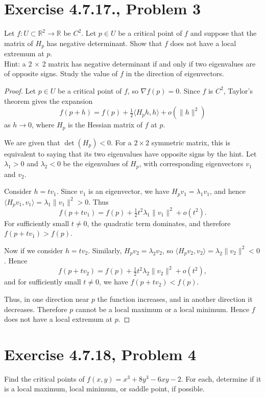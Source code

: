 \documentclass{article}
\begin{document}
\section*{Exercise 4.7.17., Problem 3}
Let $f : U \subset \mathbb{R}^2 \to \mathbb{R}$ be $C^2$. Let $p \in U$ be a critical point of $f$ and suppose that the matrix of $H_p$ has negative determinant. Show that $f$ does not have a local extremum at $p$. \\
Hint: a 2 × 2 matrix has negative determinant if and only if two eigenvalues are of opposite signs. Study the value of $f$ in the direction of eigenvectors. 
\begin{proof}
Let $p \in U$ be a critical point of $f$, so $\nabla f(p)=0$. Since $f$ is $C^2$, Taylor's theorem gives the expansion
\[
f(p+h)=f(p)+\tfrac12 \langle H_p h, h\rangle + o(\|h\|^2)
\]
as $h \to 0$, where $H_p$ is the Hessian matrix of $f$ at $p$.

We are given that $\det(H_p)<0$. For a $2\times 2$ symmetric matrix, this is equivalent to saying that its two eigenvalues have opposite signs by the hint. Let $\lambda_1>0$ and $\lambda_2<0$ be the eigenvalues of $H_p$, with corresponding eigenvectors $v_1$ and $v_2$.

Consider $h=t v_1$. Since $v_1$ is an eigenvector, we have $H_p v_1=\lambda_1 v_1$, and hence $\langle H_p v_1, v_1\rangle=\lambda_1 \|v_1\|^2>0$. Thus
\[
f(p+t v_1)=f(p)+\tfrac12 t^2 \lambda_1 \|v_1\|^2 + o(t^2).
\]
For sufficiently small $t\neq 0$, the quadratic term dominates, and therefore $f(p+t v_1)>f(p)$.

Now if we consider $h=t v_2$. Similarly, $H_p v_2=\lambda_2 v_2$, so $\langle H_p v_2, v_2\rangle=\lambda_2 \|v_2\|^2<0$. Hence
\[
f(p+t v_2)=f(p)+\tfrac12 t^2 \lambda_2 \|v_2\|^2 + o(t^2),
\]
and for sufficiently small $t\neq 0$, we have $f(p+t v_2)<f(p)$.

Thus, in one direction near $p$ the function increases, and in another direction it decreases. Therefore $p$ cannot be a local maximum or a local minimum. Hence $f$ does not have a local extremum at $p$.
\end{proof}
\clearpage

\section*{Exercise 4.7.18, Problem 4}
 Find the critical points of $f(x, y) = x^3 + 8y^3 - 6xy - 2$. For each, determine if it is a local maximum, local minimum, or saddle point, if possible. 
\end{document}
